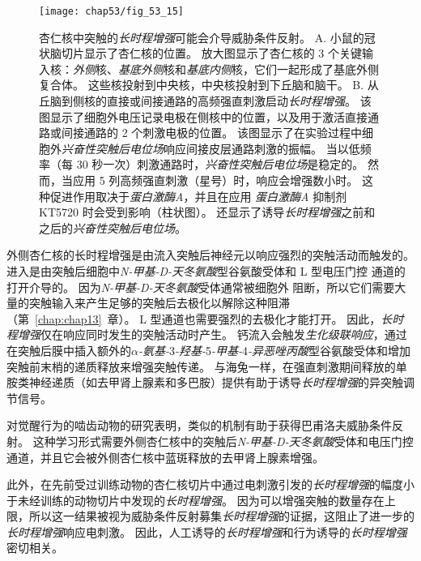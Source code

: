 \begin{figure}[htbp]
	\centering
	\texttt{[image: chap53/fig\_53\_15]}
	\caption{杏仁核中突触的\textit{长时程增强}可能会介导威胁条件反射。
		A. 小鼠的冠状脑切片显示了杏仁核的位置。
		放大图显示了杏仁核的 3 个关键输入核：\textit{外侧}核、\textit{基底外侧}核和\textit{基底内侧}核，它们一起形成了基底外侧复合体。
		这些核投射到中央核，中央核投射到下丘脑和脑干\cite{maren1999long}。
		B. 从丘脑到侧核的直接或间接通路的高频强直刺激启动\textit{长时程增强}。
		该图显示了细胞外电压记录电极在侧核中的位置，以及用于激活直接通路或间接通路的 2 个刺激电极的位置。
		该图显示了在实验过程中细胞外\textit{兴奋性突触后电位场}响应间接皮层通路刺激的振幅。
		当以低频率（每 30 秒一次）刺激通路时，\textit{兴奋性突触后电位场}是稳定的。
		然而，当应用 5 列高频强直刺激（星号）时，响应会增强数小时。
		这种促进作用取决于\textit{蛋白激酶A}，并且在应用 \textit{蛋白激酶A} 抑制剂 KT5720 时会受到影响（柱状图）。
		还显示了诱导\textit{长时程增强}之前和之后的\textit{兴奋性突触后电位场}\cite{huang1998postsynaptic,huang2000both}。}
	\label{fig:53_15}
\end{figure}


外侧杏仁核的长时程增强是由流入突触后神经元以响应强烈的突触活动而触发的。
进入是由突触后细胞中\textit{N-甲基-D-天冬氨酸}型谷氨酸受体和 L 型电压门控  通道的打开介导的。
因为\textit{N-甲基-D-天冬氨酸}受体通常被细胞外  阻断，所以它们需要大量的突触输入来产生足够的突触后去极化以解除这种阻滞（第~\ref{chap:chap13}~章）。
L 型通道也需要强烈的去极化才能打开。
因此，\textit{长时程增强}仅在响应同时发生的突触活动时产生。
钙流入会触发\textit{生化级联响应}，通过在突触后膜中插入额外的\textit{$\alpha$-氨基-}3\textit{-羟基-}5\textit{-甲基-}4\textit{-异恶唑丙酸}型谷氨酸受体和增加突触前末梢的递质释放来增强突触传递。
与海兔一样，在强直刺激期间释放的单胺类神经递质（如去甲肾上腺素和多巴胺）提供有助于诱导\textit{长时程增强}的异突触调节信号。


对觉醒行为的啮齿动物的研究表明，类似的机制有助于获得巴甫洛夫威胁条件反射。
这种学习形式需要外侧杏仁核中的突触后\textit{N-甲基-D-天冬氨酸}受体和电压门控通道，并且它会被外侧杏仁核中蓝斑释放的去甲肾上腺素增强。


此外，在先前受过训练动物的杏仁核切片中通过电刺激引发的\textit{长时程增强}的幅度小于未经训练的动物切片中发现的\textit{长时程增强}。
因为可以增强突触的数量存在上限，所以这一结果被视为威胁条件反射募集\textit{长时程增强}的证据，这阻止了进一步的\textit{长时程增强}响应电刺激。
因此，人工诱导的\textit{长时程增强}和行为诱导的\textit{长时程增强}密切相关。


